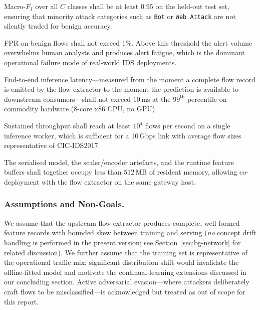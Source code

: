 \begin{description}[leftmargin=1.2em,itemsep=2pt,topsep=2pt]
    \item[Detection quality.] Macro-$F_1$ over all $C$ classes shall be at least $0.95$ on the held-out test set, ensuring that minority attack categories such as \texttt{Bot} or \texttt{Web Attack} are not silently traded for benign accuracy.
    \item[False-positive rate (FPR).] FPR on benign flows shall not exceed $1\%$. Above this threshold the alert volume overwhelms human analysts and produces alert fatigue, which is the dominant operational failure mode of real-world IDS deployments.
    \item[Per-flow latency.] End-to-end inference latency---measured from the moment a complete flow record is emitted by the flow extractor to the moment the prediction is available to downstream consumers---shall not exceed $10\,\text{ms}$ at the $99^{\text{th}}$ percentile on commodity hardware (8-core x86 CPU, no GPU).
    \item[Throughput.] Sustained throughput shall reach at least $10^4$ flows per second on a single inference worker, which is sufficient for a 10\,Gbps link with average flow sizes representative of CIC-IDS2017.
    \item[Resource footprint.] The serialised model, the scaler/encoder artefacts, and the runtime feature buffers shall together occupy less than $512\,\text{MB}$ of resident memory, allowing co-deployment with the flow extractor on the same gateway host.
\end{description}

\subsubsection*{Assumptions and Non-Goals.}
We assume that the upstream flow extractor produces complete, well-formed feature records with bounded skew between training and serving (\emph{no} concept drift handling is performed in the present version; see Section~\ref{sec:bg-network} for related discussion). We further assume that the training set is representative of the operational traffic mix; significant distribution shift would invalidate the offline-fitted model and motivate the continual-learning extensions discussed in our concluding section. Active adversarial evasion---where attackers deliberately craft flows to be misclassified---is acknowledged but treated as out of scope for this report.
